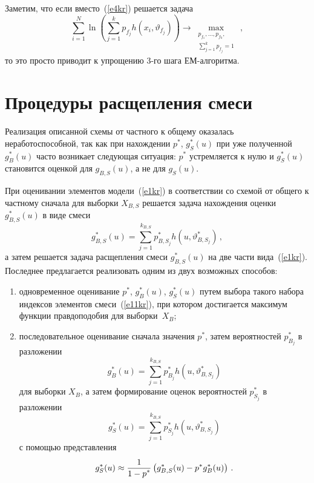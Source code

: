 \begin{multicols}{2}
     Заметим, что если вместо~(\ref{e4kr}) решается задача
     \begin{equation*}
     \sum\limits_{i=1}^N\ln \left ( \sum\limits_{j=1}^k p_{f_j} h\left (x_i, 
\vartheta_{f_j}\right )\right ) \rightarrow \underset{\substack{{p_{f_1},\ldots 
,p_{f_k},}\\{\sum\limits_{j=1}^k p_{f_j}=1}}}{\max}\,,
     \end{equation*}
то это просто приводит к упрощению 3-го шага ЕМ-алгоритма.

\section{Процедуры расщепления смеси}

     Реализация описанной схемы от частного к общему оказалась 
неработоспособной, так как при нахождении $p^*$, $g_S^*(u)$ при уже 
полученной $g_B^*(u)$ часто возникает следующая ситуация: $p^*$ устремляется 
к нулю и $g_S^*(u)$ становится оценкой для $g_{B,S}(u)$, а не для $g_S(u)$.
     
     При оценивании элементов модели~(\ref{e1kr}) в соответствии со схемой 
от общего к частному сначала для выборки $X_{B,S}$ решается задача 
нахождения оценки $g_{B,S}^*(u)$ в виде смеси
     \begin{equation}
g_{B,S}^* (u) = \sum\limits_{j=1}^{k_{B,S}} p_{B,S_j}^* h\left ( 
u,\vartheta_{B,S_j}^* \right )\,,
     \label{e11kr}
     \end{equation}
а затем решается задача расщепления смеси $g_{B,S}^*(u)$ на две части 
вида~(\ref{e1kr}). Последнее предлагается реализовать одним из двух 
возможных способов: 
\begin{enumerate}[(1)]
\item одновременное оценивание $p^*$, $g_{B}^*(u)$, $g_S^*(u)$ путем 
выбора такого набора индексов элементов смеси~(\ref{e11kr}), при 
котором достигается максимум функции правдоподобия для выборки~$X_B$;
\item последовательное оценивание сначала значения $p^*$, затем 
вероятностей $p_{B_j}^*$ в разложении 
$$
g_B^*(u) = \sum\limits_{j=1}^{k_{B,S}}p_{B_j}^* h\left (u, \vartheta_{B,S_j}^*\right )
$$ 
для выборки $X_B$, а затем формирование оценок вероятностей $p_{S_j}^*$ в 
разложении 
$$
g_S^*(u) = \sum\limits_{j=1}^{k_{B,S}}p_{S_j}^* h  \left (u,\vartheta_{B,S_j}^*\right )
$$ 
с помощью представления $$
g_S^*(u) \approx \displaystyle\frac{\displaystyle 1\mathstrut}{\displaystyle 1-p^*\mathstrut}\left ( g_{B,S}^*(u) -p^* g_B^*(u)\right )\,.
$$
     \end{enumerate}
     

\end{multicols}
